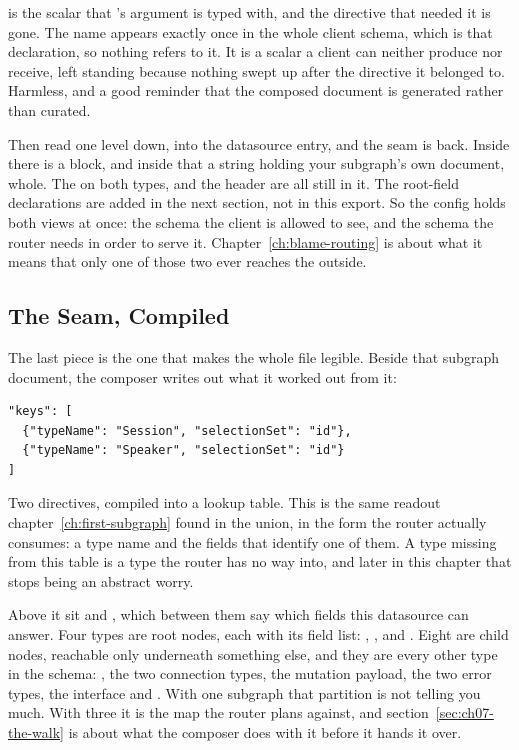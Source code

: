 %
 is the scalar that 's argument is typed with, and
the directive that needed it is gone. The name appears exactly once in the
whole client schema, which is that declaration, so nothing refers to it. It is
a scalar a client can neither produce nor receive, left standing because
nothing swept up after the directive it belonged to. Harmless, and a good
reminder that the composed document is generated rather than curated.

%
Then read one level down, into the datasource entry, and the seam is back.
Inside  there is a  block, and inside that
a  string holding your subgraph's own document, whole. The
 on both types,  and the  header
are all still in it. The root-field  declarations are added
in the next section, not in this export. So the config holds
both views at once: the schema the client is allowed to see, and the schema the
router needs in order to serve it. Chapter~\ref{ch:blame-routing} is about what
it means that only one of those two ever reaches the outside.

\subsection{The Seam, Compiled}

%
The last piece is the one that makes the whole file legible. Beside that
subgraph document, the composer writes out what it worked out from it:

\begin{verbatim}
"keys": [
  {"typeName": "Session", "selectionSet": "id"},
  {"typeName": "Speaker", "selectionSet": "id"}
]
\end{verbatim}

%
Two  directives, compiled into a lookup table. This is the same
readout chapter~\ref{ch:first-subgraph} found in the  union, in
the form the router actually consumes: a type name and the fields that identify
one of them. A type missing from this table is a type the router has no way
into, and later in this chapter that stops being an abstract worry.

%
Above it sit  and , which between them say
which fields this datasource can answer. Four types are root nodes, each with
its field list: , ,  and
. Eight are child nodes, reachable only underneath something
else, and they are every other type in the schema: , the two
connection types, the mutation payload, the two error types, the 
interface and . With one subgraph that partition is not telling you
much. With three it
is the map the router plans against, and
section~\ref{sec:ch07-the-walk} is about what the composer does with it before
it hands it over.
%
